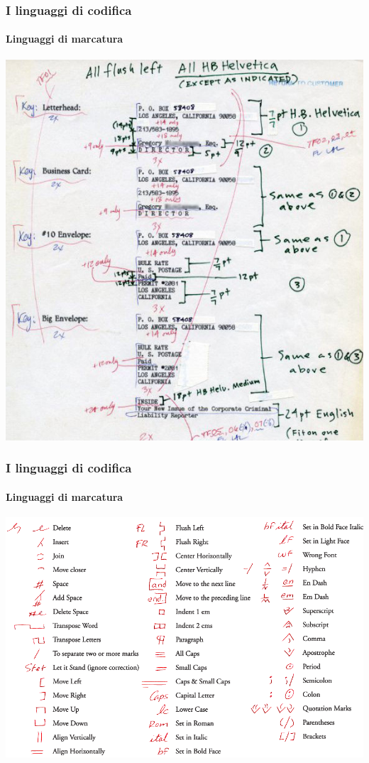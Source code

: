 \begin{frame}
	\frametitle{I linguaggi di codifica}
	\framesubtitle{Linguaggi di marcatura}
	\addtocounter{nframe}{1}

	\begin{center}
		\includegraphics[width=.6\textwidth]{imgs/xml-markup001.jpg}
	\end{center}

\end{frame}

\begin{frame}
	\frametitle{I linguaggi di codifica}
	\framesubtitle{Linguaggi di marcatura}
	\addtocounter{nframe}{1}

	\begin{center}
		\includegraphics[width=.9\textwidth]{imgs/xml-MarkupConvention.png}
	\end{center}

\end{frame}

